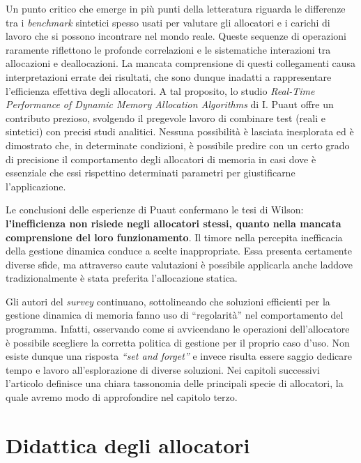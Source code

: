 Un punto critico che emerge in più punti della letteratura riguarda le differenze tra i \textit{benchmark} sintetici spesso usati per valutare gli allocatori e i carichi di lavoro che si possono incontrare nel mondo reale. Queste sequenze di operazioni raramente riflettono le profonde correlazioni e le sistematiche interazioni tra allocazioni e deallocazioni. La mancata comprensione di questi collegamenti causa interpretazioni errate dei risultati, che sono dunque inadatti a rappresentare l’efficienza effettiva degli allocatori. A tal proposito, lo studio \textit{Real-Time Performance of Dynamic Memory Allocation Algorithms} di I. Puaut\cite{puaut2002} offre un contributo prezioso, svolgendo il pregevole lavoro di combinare test (reali e sintetici) con precisi studi analitici. Nessuna possibilità è lasciata inesplorata ed è dimostrato che, in determinate condizioni, è possibile predire con un certo grado di precisione il comportamento degli allocatori di memoria in casi dove è essenziale che essi rispettino determinati parametri per giustificarne l’applicazione.

Le conclusioni delle esperienze di Puaut confermano le tesi di Wilson: \textbf{l’inefficienza non risiede negli allocatori stessi, quanto nella mancata comprensione del loro funzionamento}. Il timore nella percepita inefficacia della gestione dinamica conduce a scelte inappropriate. Essa presenta certamente diverse sfide, ma attraverso caute valutazioni è possibile applicarla anche laddove tradizionalmente è stata preferita l’allocazione statica.

Gli autori del \textit{survey} continuano, sottolineando che soluzioni efficienti per la gestione dinamica di memoria fanno uso di ``regolarità'' nel comportamento del programma. Infatti, osservando come si avvicendano le operazioni dell'allocatore è possibile scegliere la corretta politica di gestione per il proprio caso d’uso. Non esiste dunque una risposta \textit{``set and forget''} e invece risulta essere saggio dedicare tempo e lavoro all’esplorazione di diverse soluzioni. Nei capitoli successivi l’articolo definisce una chiara tassonomia delle principali specie di allocatori, la quale avremo modo di approfondire nel capitolo terzo.

\section{Didattica degli allocatori}

